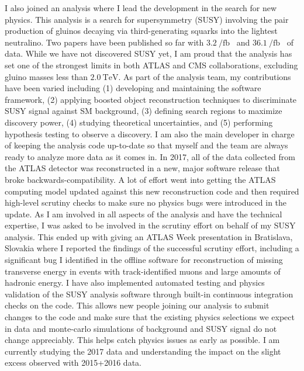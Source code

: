\documentclass[letterpaper, 10pt]{article}
\begin{document}
I also joined an analysis where I lead the development in the search for new physics. This analysis is a search for supersymmetry (SUSY) involving the pair production of gluinos decaying via third-generating squarks into the lightest neutralino. Two papers have been published so far with $\SI{3.2}{\per\femto\barn}$~ and $\SI{36.1}{\per\femto\barn}$~ of data. While we have not discovered SUSY yet, I am proud that the analysis has set one of the strongest limits in both ATLAS and CMS collaborations, excluding gluino masses less than $\SI{2.0}{\tera\electronvolt}$. As part of the analysis team, my contributions have been varied including (1) developing and maintaining the software framework, (2) applying boosted object reconstruction techniques to discriminate SUSY signal against SM background, (3) defining search regions to maximize discovery power, (4) studying theoretical uncertainties, and (5) performing hypothesis testing to observe a discovery. I am also the main developer in charge of keeping the analysis code up-to-date so that myself and the team are always ready to analyze more data as it comes in. In 2017, all of the data collected from the ATLAS detector was reconstructed in a new, major software release that broke backwards-compatibility. A lot of effort went into getting the ATLAS computing model updated against this new reconstruction code and then required high-level scrutiny checks to make sure no physics bugs were introduced in the update. As I am involved in all aspects of the analysis and have the technical expertise, I was asked to be involved in the scrutiny effort on behalf of my SUSY analysis. This ended up with giving an ATLAS Week presentation in Bratislava, Slovakia where I reported the findings of the successful scrutiny effort, including a significant bug I identified in the offline software for reconstruction of missing transverse energy in events with track-identified muons and large amounts of hadronic energy. I have also implemented automated testing and physics validation of the SUSY analysis software through built-in continuous integration checks on the code. This allows new people joining our analysis to submit changes to the code and make sure that the existing physics selections we expect in data and monte-carlo simulations of background and SUSY signal do not change appreciably. This helps catch physics issues as early as possible. I am currently studying the 2017 data and understanding the impact on the slight excess observed with 2015+2016 data.
\end{document}
